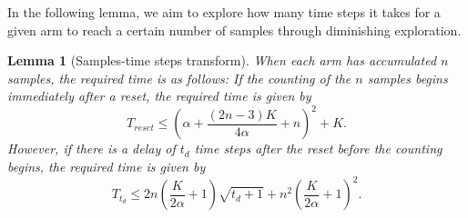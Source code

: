 \documentclass[twoside]{article}
\theoremstyle{plain}
\newtheorem{lemma}[theorem]{Lemma}
\theoremstyle{definition}
\theoremstyle{remark}
\begin{document}
In the following lemma, we aim to explore how many time steps it takes for a given arm to reach a certain number of samples through diminishing exploration.

\begin{lemma}[Samples-time steps transform]\label{applemma:samples-time}
    When each arm has accumulated \(n\) samples, the required time is as follows: 
    If the counting of the \(n\) samples begins immediately after a reset, the required time is given by
    \begin{equation}\label{eqn:Treset}
        T_{reset}\leq \left(\alpha+\frac{\left(2n-3\right)K}{4\alpha}+n\right)^2+K.
    \end{equation}
    However, if there is a delay of \(t_{d}\) time steps after the reset before the counting begins, the required time is given by 
    \begin{equation}\label{eqn:Ttd}
        T_{t_{d}}\leq 2n\left(\frac{K}{2\alpha}+1\right)\sqrt{t_{d}+1}+n^{2}\left(\frac{K}{2\alpha}+1\right)^{2}.
    \end{equation}
    
\end{lemma}
\end{document}
